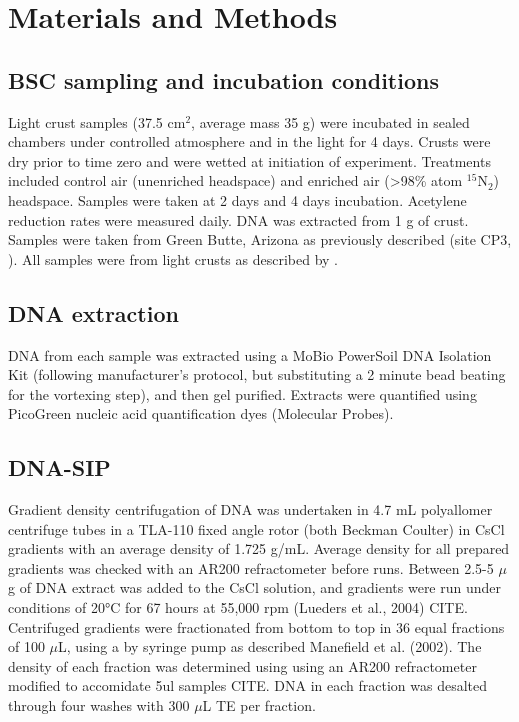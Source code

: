 \section{Materials and Methods}
\subsection{BSC sampling and incubation conditions}
Light crust samples (37.5 cm$^{2}$, average mass 35 g) were incubated in sealed
chambers under controlled atmosphere and in the light for 4 days. Crusts were
dry prior to time zero and were wetted at initiation of experiment. Treatments
included control air (unenriched headspace) and enriched air (\textgreater98\%
atom $^{15}$N$_{2}$) headspace. Samples were taken at 2 days and 4 days
incubation.  Acetylene reduction rates were measured daily. DNA was extracted
from 1 g of crust.  Samples were taken from Green Butte, Arizona as previously
described (site CP3, \citet{BERALDI_CAMPESI_2009}). All samples were from light
crusts as described by \cite{15643930}.
\subsection{DNA extraction}
DNA from each sample was extracted using a MoBio PowerSoil DNA Isolation Kit (following manufacturer’s protocol, but substituting a 2 minute bead beating for the vortexing step), and then gel purified. Extracts were quantified using PicoGreen nucleic acid quantification dyes (Molecular Probes). 
\subsection{DNA-SIP}
 Gradient density centrifugation of DNA was undertaken in 4.7 mL polyallomer
 centrifuge tubes in a TLA-110 fixed angle rotor (both Beckman Coulter) in CsCl
 gradients with an average density of 1.725 g/mL.  Average density for all
 prepared gradients was checked with an AR200 refractometer before runs.
 Between 2.5-5 $\mu$g of DNA extract was added to the CsCl solution, and
 gradients were run under conditions of 20°C for 67 hours at 55,000 rpm
 (Lueders et al., 2004) CITE. Centrifuged gradients were fractionated from bottom to
 top in 36 equal fractions of 100 $\mu$L, using a by syringe pump as described
 Manefield et al. (2002). The density of each fraction was determined using
 using an AR200 refractometer modified to accomidate 5ul
 samples CITE. DNA in each fraction was desalted through four washes
 with 300 $\mu$L TE per fraction.  
